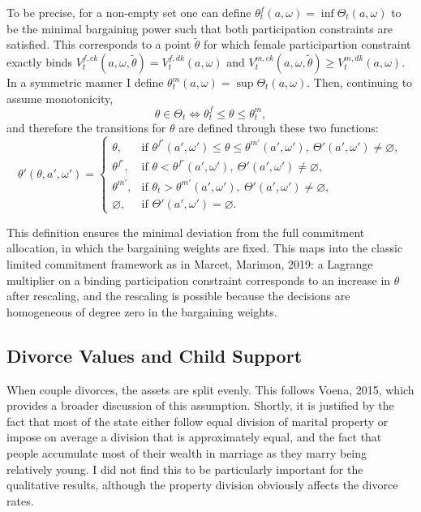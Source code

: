\documentclass[12pt,letter]{article}
\begin{document}
To be precise, for a non-empty set one can define $\theta^f_t(a,\omega) = \inf \Theta_t(a,\omega)$ to be the minimal bargaining power such that both participation constraints are satisfied. This corresponds to a point $\tilde{\theta}$ for which female participartion constraint exactly binds $V_t^{f,ck}(a,\omega,\tilde\theta) = V_t^{f,dk}(a,\omega)$ and $V_t^{m,ck}(a,\omega,\tilde\theta) \geq V_t^{m,dk}(a,\omega)$. In a symmetric manner I define $\theta^m_t(a,\omega) = \sup \Theta_t(a,\omega)$. Then, continuing to assume monotonicity,  
\[\theta \in \Theta_t \Leftrightarrow \theta^f_t \leq \theta \leq \theta^m_t,\]
and therefore the transitions for $\theta$ are defined through these two functions:
\begin{equation}\theta'(\theta,a',\omega') = \begin{cases} \theta, & \text{if \ }  \theta^{f\prime}(a',\omega') \leq \theta \leq \theta^{m\prime}(a',\omega'), \ \Theta'(a',\omega') \neq \varnothing,\\
\theta^{f\prime}, & \text{if \ }  \theta < \theta^{f\prime}(a',\omega'),\ \Theta'(a',\omega') \neq \varnothing,\\
\theta^{m\prime}, & \text{if \ }    \theta_t > \theta^{m'}(a',\omega'),\ \Theta'(a',\omega') \neq \varnothing,\\
\varnothing, & \text{if \ }  \Theta'(a',\omega') = \varnothing.
\end{cases}\end{equation}

This definition ensures the minimal deviation from the full commitment allocation, in which the bargaining weights are fixed. This maps into the classic limited commitment framework as in Marcet, Marimon, 2019: a Lagrange multiplier on a binding participation constraint corresponds to an increase in $\theta$ after rescaling, and the rescaling is possible because the decisions are homogeneous of degree zero in the bargaining weights.





\subsection{Divorce Values and Child Support\label{divorcevalues}}

When couple divorces, the assets are split evenly. This follows Voena, 2015, which provides a broader discussion of this assumption. Shortly, it is justified by the fact that most of the state either follow equal division of marital property or impose on average a division that is approximately equal, and the fact that people accumulate most of their wealth in marriage as they marry being relatively young. I did not find this to be particularly important for the qualitative results, although the property division obviously affects the divorce rates.
\end{document}
